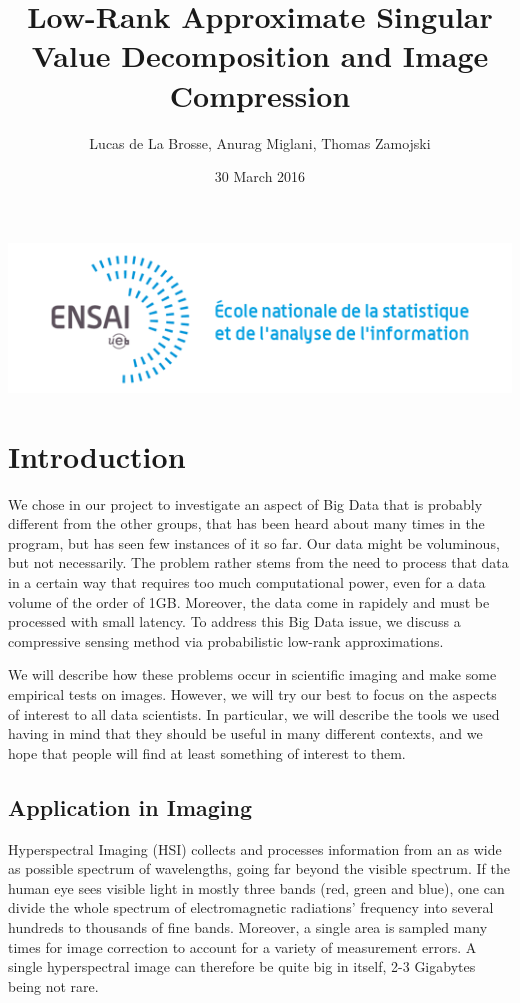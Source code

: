 \documentclass[a4paper,11pt]{amsart}
\date{30 March 2016}
\author{Lucas de La Brosse, Anurag Miglani, Thomas Zamojski}
\title{Low-Rank Approximate Singular Value Decomposition and Image Compression}
\begin{document}
\maketitle
\includegraphics{logo.png}

\section{Introduction}
We chose in our project to investigate an aspect of Big Data that is probably different from the other groups, that has been heard about many times in the program, but has seen few instances of it so far. Our data might be voluminous, but not necessarily. The problem rather stems from the need to process that data in a certain way that requires too much computational power, even for a data volume of the order of 1GB. Moreover, the data come in rapidely and must be processed with small latency. To address this Big Data issue, we discuss a compressive sensing method via probabilistic low-rank approximations. 

We will describe how these problems occur in scientific imaging and make some empirical tests on images. However, we will try our best to focus on the aspects of interest to all data scientists. In particular, we will describe the tools we used having in mind that they should be useful in many different contexts, and we hope that people will find at least something of interest to them.

\subsection{Application in Imaging}
Hyperspectral Imaging (HSI) collects and processes information from an as wide as possible spectrum of wavelengths, going far beyond the visible spectrum. If the human eye sees visible light in mostly three bands (red, green and blue), one can divide the whole spectrum of electromagnetic radiations' frequency into several hundreds to thousands of fine bands. Moreover, a single area is sampled many times for image correction to account for a variety of measurement errors. A single hyperspectral image can therefore be quite big in itself, 2-3 Gigabytes being not rare.
\end{document}
